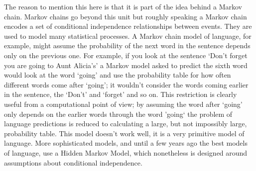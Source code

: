 \documentclass[11pt,a4paper]{scrartcl}
\begin{document}
The reason to mention this here is that it is part of the idea behind
a Markov chain. Markov chains go beyond this unit but roughly speaking
a Markov chain encodes a set of conditional independence relationships
between events. They are used to model many statistical processes. A
Markov chain model of language, for example, might assume the
probability of the next word in the sentence depends only on the
previous one. For example, if you look at the sentence \lq{}Don't
forget you are going to Aunt Alicia's\rq{} a Markov model asked to
predict the sixth word would look at the word \lq{}going\rq{} and use
the probability table for how often different words come after
\lq{}going\rq{}; it wouldn't consider the words coming earlier in the
sentence, the \lq{}Don't\rq{} and \lq{}forget\rq{} and so on. This
restriction is clearly useful from a computational point of view; by
assuming the word after \lq{}going\rq{} only depends on the earlier
words through the word \rq{}going\lq{} the problem of language
predictions is reduced to calculating a large, but not impossibly
large, probability table. This model doesn't work well, it is a very
primitive model of language. More sophisticated models, and until a
few years ago the best models of language, use a Hidden Markov Model,
which nonetheless is designed around assumptions about conditional
independence.
\end{document}
